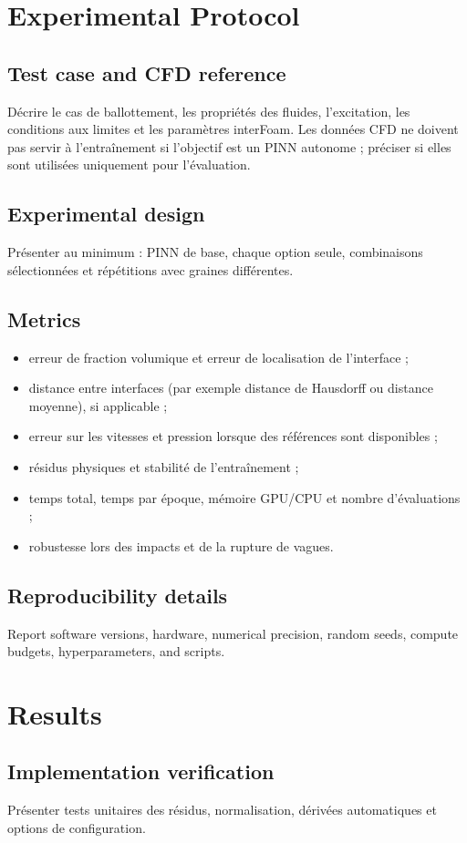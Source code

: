 \documentclass[11pt,a4paper]{article}
\begin{document}
\section{Experimental Protocol}
\subsection{Test case and CFD reference}
Décrire le cas de ballottement, les propriétés des fluides, l'excitation, les conditions aux limites et les paramètres interFoam. Les données CFD ne doivent pas servir à l'entraînement si l'objectif est un PINN autonome ; préciser si elles sont utilisées uniquement pour l'évaluation.
\subsection{Experimental design}
Présenter au minimum : PINN de base, chaque option seule, combinaisons sélectionnées et répétitions avec graines différentes.
\subsection{Metrics}
\begin{itemize}[nosep]
\item erreur de fraction volumique et erreur de localisation de l'interface ;
\item distance entre interfaces (par exemple distance de Hausdorff ou distance moyenne), si applicable ;
\item erreur sur les vitesses et pression lorsque des références sont disponibles ;
\item résidus physiques et stabilité de l'entraînement ;
\item temps total, temps par époque, mémoire GPU/CPU et nombre d'évaluations ;
\item robustesse lors des impacts et de la rupture de vagues.
\end{itemize}
\subsection{Reproducibility details}
Report software versions, hardware, numerical precision, random seeds, compute budgets, hyperparameters, and scripts.

\section{Results}
\subsection{Implementation verification}
Présenter tests unitaires des résidus, normalisation, dérivées automatiques et options de configuration.
\end{document}
